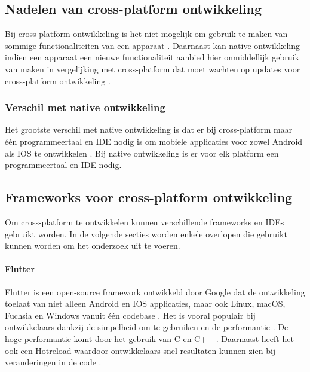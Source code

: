 \subsection{Nadelen van cross-platform ontwikkeling}
Bij cross-platform ontwikkeling is het niet mogelijk om gebruik te maken van sommige 
functionaliteiten van een apparaat \autocite{Terekhov2022}. Daarnaast kan native 
ontwikkeling indien een apparaat een nieuwe functionaliteit aanbied hier onmiddellijk gebruik 
van maken in vergelijking met cross-platform dat moet wachten op updates voor cross-platform 
ontwikkeling \autocite{Sakovich22023}.

\subsubsection{Verschil met native ontwikkeling}
Het grootste verschil met native ontwikkeling is dat er bij cross-platform maar één 
programmeertaal en IDE nodig is om mobiele applicaties voor zowel Android als IOS te 
ontwikkelen \autocite{Hu2021}. Bij native ontwikkeling is er voor elk platform een 
programmeertaal en IDE nodig. 

\subsection{Frameworks voor cross-platform ontwikkeling}
Om cross-platform te ontwikkelen kunnen verschillende frameworks en 
IDEs gebruikt worden. In de volgende secties worden enkele overlopen die gebruikt kunnen worden  
om het onderzoek uit te voeren.

\paragraph{Flutter}
Flutter is een open-source framework ontwikkeld door Google dat de ontwikkeling toelaat 
van niet alleen Android en IOS applicaties, maar ook Linux, macOS, Fuchsia en Windows 
vanuit één codebase \autocite{Okeke2022a}. Het is vooral populair bij ontwikkelaars 
dankzij de simpelheid om te gebruiken en de performantie \autocite{Sakovich22023}. De 
hoge performantie komt door het gebruik van C en C++ \autocite{Terekhov2022}. Daarnaast 
heeft het ook een \gls{Hotreload} waardoor ontwikkelaars snel resultaten kunnen zien bij 
veranderingen in de code \autocite{Sakovich22023}.

